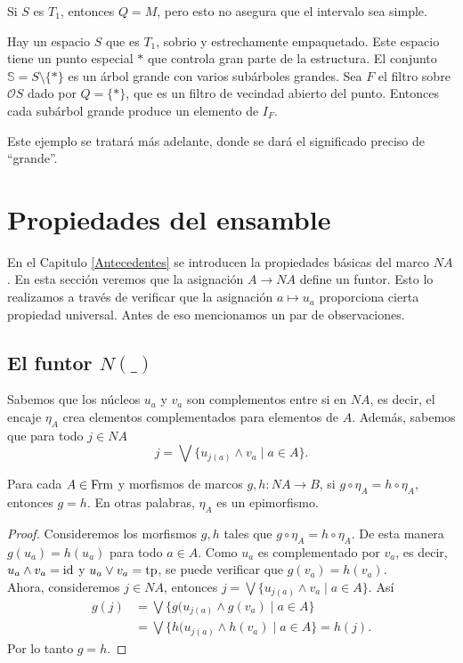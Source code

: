 Si $S$ es $T_1$, entonces $Q=M$, pero esto no asegura que el intervalo sea simple.\\

\begin{ej}
    Hay un espacio $S$ que es $T_1$, sobrio y estrechamente empaquetado. Este espacio tiene un punto especial $*$ que controla gran parte de la estructura. El conjunto $\mathbb{S}=S\setminus \{*\}$ es un árbol grande con varios subárboles grandes. Sea $F$ el filtro sobre $\mathcal{O}S$ dado por $Q=\{*\}$, que es un filtro de vecindad abierto del punto. Entonces cada subárbol grande produce un elemento de $I_F$.\\
\end{ej}

Este ejemplo se tratará más adelante, donde se dará el significado preciso de ``grande''.

\section{Propiedades del ensamble}

En el Capitulo \ref{Antecedentes} se introducen la propiedades básicas del marco $NA$. En esta sección veremos que la asignación $A\to NA$ define un funtor. Esto lo realizamos a través de verificar que la asignación $a\mapsto u_a$ proporciona cierta propiedad universal. Antes de eso mencionamos un par de observaciones.

\subsection{El funtor $N( \_ )$}

Sabemos que los núcleos $u_a$ y $v_a$ son complementos entre si en $NA$, es decir, el encaje $\eta_A$ crea elementos complementados para elementos de $A$. Además, sabemos que para todo $j\in NA$
\[
j=\bigvee\{u_{j(a)}\wedge v_a\mid a\in A\}.
\]

\begin{lem}\label{Lema6.2.1}
    Para cada $A\in \mathrm{Frm}$ y morfismos de marcos $g, h\colon NA\to B$, si $g\circ \eta_A=h\circ \eta_A$, entonces $g=h$. En otras palabras, $\eta_A$ es un epimorfismo.
\end{lem}

\begin{proof}
    Consideremos los morfismos $g, h$ tales que $g\circ \eta_A=h\circ \eta_A$. De esta manera $g(u_a)=h(u_a)$ para todo $a\in A$. Como $u_a$ es complementado por $v_a$, es decir, $u_a\wedge v_a=\mathrm{id}$ y $u_a\vee v_a=\mathrm{tp}$, se puede verificar que $g(v_a)=h(v_a)$.\\

    Ahora, consideremos $j\in NA$, entonces 
    $j=\bigvee\{u_{j(a)}\wedge v_a\mid a\in A\}$. Así
    \[
    \begin{split}
    g(j)& =\bigvee\{g(u_{j(a)}\wedge g(v_a)\mid a\in A\}
    \\
    & =\bigvee\{h(u_{j(a)}\wedge h(v_a)\mid a\in A\}=h(j).
    \end{split}
    \]
    Por lo tanto $g=h$.
\end{proof}

